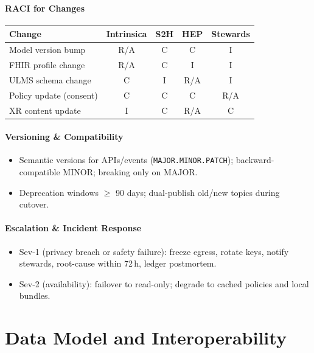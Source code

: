 \documentclass[11pt]{article}
\theoremstyle{plain}
\begin{document}
\paragraph{RACI for Changes}
\begin{center}
\begin{tabular}{l|c|c|c|c}
\hline
\textbf{Change} & \textbf{Intrinsica} & \textbf{S2H} & \textbf{HEP} & \textbf{Stewards} \\
\hline
Model version bump & R/A & C & C & I \\
FHIR profile change & R/A & C & I & I \\
ULMS schema change & C & I & R/A & I \\
Policy update (consent) & C & C & C & R/A \\
XR content update & I & C & R/A & C \\
\hline
\end{tabular}
\end{center}

\paragraph{Versioning \& Compatibility}
\begin{itemize}
  \item Semantic versions for APIs/events (\texttt{MAJOR.MINOR.PATCH}); backward-compatible MINOR; breaking only on MAJOR.
  \item Deprecation windows $\geq$ 90 days; dual-publish old/new topics during cutover.
\end{itemize}

\paragraph{Escalation \& Incident Response}
\begin{itemize}
  \item Sev-1 (privacy breach or safety failure): freeze egress, rotate keys, notify stewards, root-cause within 72\,h, ledger postmortem.
  \item Sev-2 (availability): failover to read-only; degrade to cached policies and local bundles.
\end{itemize}




\section{Data Model and Interoperability}
\end{document}
